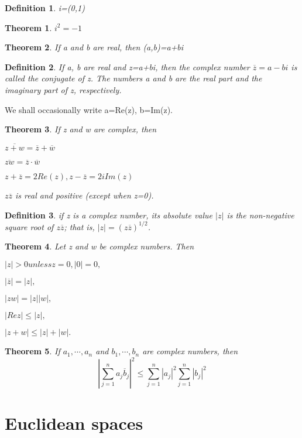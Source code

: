 \documentclass{article}
\newtheorem{defi}{Definition}
\newtheorem{theo}{Theorem}
\begin{document}
\begin{defi}
	i=(0,1)
\end{defi}

\begin{theo}
	$i^2=-1$
\end{theo}

\begin{theo}
	If a and b are real, then (a,b)=a+bi
\end{theo}

\begin{defi}
	If a, b are real and z=a+bi, then the complex number $\overline{z}=a-bi$ is called the conjugate of z. The numbers a and b are the real part and the imaginary part of z, respectively.
\end{defi}

We shall occasionally write a=Re(z), b=Im(z).

\begin{theo}
	If z and w are complex, then
	
$ \overline{z+w}=\overline{z}+\overline{w} $

$ \overline{zw}=\overline{z}\cdot\overline{w} $

$ z+\overline{z}=2Re(z), z-\overline{z}=2iIm(z) $

$ z\overline{z} $ is real and positive (except when z=0).
\end{theo}

\begin{defi}
	if z is a complex number, its absolute value $ |z| $ is the non-negative square root of $ z\overline{z} $; that is, $ |z|=(z\overline{z})^{1/2} $.
\end{defi}

\begin{theo}
	Let z and w be complex numbers. Then

$ |z|>0 unless z=0, |0|=0, $

$ |\overline{z}|=|z|, $

$ |zw|=|z||w|, $

$ |Rez|\le |z|, $

$ |z+w|\le|z|+|w|. $

\end{theo}

\begin{theo}
	If $ a_1,\cdots,a_n  $ and $ b_1,\cdots,b_n $ are complex numbers, then
	\[
	|\sum_{j=1}^{n}a_j\overline{b}_j|^2\le \sum_{j=1}^{n} |a_j|^2\sum_{j=1}^{n}|b_j|^2
	\]
\end{theo}

\section{Euclidean spaces}
\end{document}
